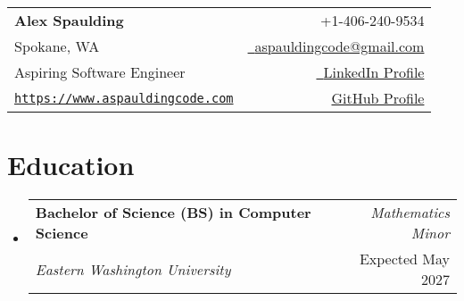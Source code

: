 \documentclass[a4paper,11pt]{article}
\makeatletter
\newcommand{\resumeSubheading}[4]{
\vspace{0.5mm}\item
    \begin{tabular*}{0.98\textwidth}[t]{l@{\extracolsep{\fill}}r}
        \textbf{#1} & \textit{\footnotesize{#4}} \\
        \textit{\footnotesize{#3}} &  \footnotesize{#2}\\
    \end{tabular*}
    \vspace{-2.4mm}
}
\newcommand{\resumeSubHeadingListStart}{\begin{itemize}[leftmargin=*,labelsep=0mm]}
\newcommand{\resumeSubHeadingListEnd}{\end{itemize}\vspace{2mm}}
\newcommand{\name}{Alex Spaulding} %
\newcommand{\course}{Aspiring Software Engineer} %
\newcommand{\roll}{Spokane, WA} %
\newcommand{\phone}{406-240-9534} %
\newcommand{\emaila}{aspauldingcode@gmail.com} %
\makeatother
\begin{document}
\selectfont

{
\begin{tabularx}{\linewidth}{L r} \\
  \textbf{\Large \name} & {\raisebox{0.0\height}{\footnotesize \faPhone}\ +1-\phone}\\
  {\roll } & \href{mailto:\emaila}{\raisebox{0.0\height}{\footnotesize \faEnvelope}\ {\emaila}} \\
  \course & \href{https://linkedin.com/in/aspauldingcode}{\raisebox{0.0\height}{\footnotesize \faLinkedin}\ {LinkedIn Profile}} \\
  \href{https://www.aspauldingcode.com/}{\raisebox{0.0\height}{\footnotesize \faGlobe} {\texttt{https://www.aspauldingcode.com}}} & \href{https://github.com/aspauldingcode}{\raisebox{0.0\height}{\footnotesize \faGithub} {GitHub Profile}} \\
\end{tabularx}
}

\section{\textbf{Education}}
  \resumeSubHeadingListStart
    \resumeSubheading
      {Bachelor of Science (BS) in Computer Science}{Expected May 2027}
      {Eastern Washington University}{Mathematics Minor}
  \resumeSubHeadingListEnd
\vspace{-5.5mm}

\end{document}
